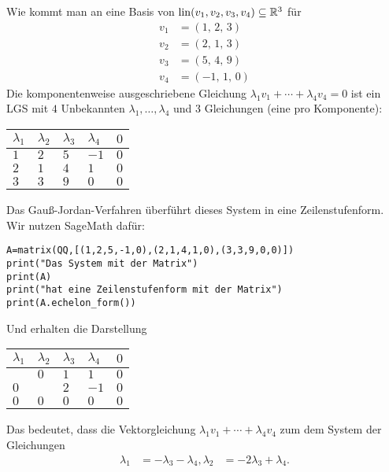 \begin{bsp} Wie kommt man an eine Basis von $\operatorname{lin}(v_1,v_2,v_3,v_4) \subseteq \mathbb R^3$ für 
	\begin{align*} 
			v_1 & = \left(1,\,2,\,3\right)
			\\ v_2 & = \left(2,\,1,\,3\right)
			\\ v_3 & = \left(5,\,4,\,9\right)
			\\ v_4 & = \left(-1,\,1,\,0\right)
	\end{align*} 
	Die komponentenweise ausgeschriebene Gleichung $\lambda_1 v_1 + \cdots + \lambda_4 v_4 =0$ ist ein LGS mit $4$ Unbekannten $\lambda_1,\ldots,\lambda_4$ und $3$ Gleichungen (eine pro Komponente): 
	\begin{center} 
	\begin{tabular}{llll|l}
		$\lambda_1$ & $\lambda_2$ & $\lambda_3$ & $\lambda_4$ & $0$ 
		\\ \hline 
		$1$ & $2$ & $5$ & $-1$ & $0$
		\\ $2$ & $1$ & $4$ & $1$ & $0$
		\\ $3$ & $3$ & $9$ & $0$ & $0$
	\end{tabular} 
	\end{center} 
	Das Gauß-Jordan-Verfahren überführt dieses System in eine Zeilenstufenform. Wir nutzen SageMath dafür: 
	\begin{verbatim}
A=matrix(QQ,[(1,2,5,-1,0),(2,1,4,1,0),(3,3,9,0,0)])
print("Das System mit der Matrix")
print(A) 
print("hat eine Zeilenstufenform mit der Matrix")
print(A.echelon_form())
	\end{verbatim} 
	Und erhalten die Darstellung
	\begin{center} 
	\begin{tabular}{llll|l}
		$\lambda_1$ & $\lambda_2$ & $\lambda_3$ & $\lambda_4$ & $0$ 
		\\ \hline 
		\boxed{$1$} & $0$ & $1$ & $1$ & $0$
		\\ $0$ & \boxed{$1$} & $2$ & $-1$ & $0$
		\\ $0$ & $0$ & $0$ & $0$ & $0$
	\end{tabular} 
	\end{center} 
	Das bedeutet, dass die Vektorgleichung $\lambda_1 v_1 + \cdots + \lambda_4 v_4$ zum dem System der Gleichungen 
	\begin{align*} 
			\lambda_1 & = - \lambda_3 - \lambda_4,
			\lambda_2  & = - 2\lambda_3 + \lambda_4.  
	\end{align*} 

\end{bsp}
